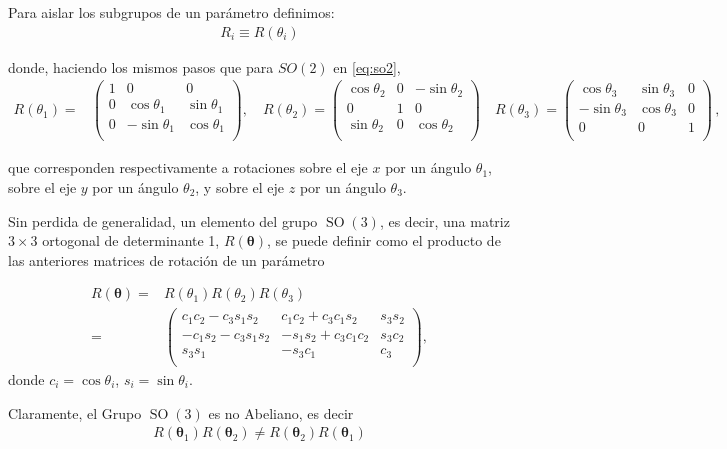 Para aislar los subgrupos de un parámetro definimos:
\begin{align}
  R_i\equiv R(\theta_i)
\end{align}
\begin{frame}
donde, haciendo los mismos pasos que para $SO(2)$ en \eqref{eq:so2},
\begin{align}
  \label{eq:lirot}
  R(\theta_1)=&
  \begin{pmatrix}
   1 &   0        &0\\
   0 &\cos\theta_1  & \sin\theta_1\\
   0 & -\sin\theta_1& \cos\theta_1\\
  \end{pmatrix},\quad R(\theta_2)=
  \begin{pmatrix}
     \cos\theta_2 &0& -\sin\theta_2\\
     0          &1& 0          \\
    \sin\theta_2  &0&  \cos\theta_2\\
  \end{pmatrix}\quad R(\theta_3)=
  \begin{pmatrix}
     \cos\theta_3 & \sin\theta_3&0\\
     -\sin\theta_3& \cos\theta_3&0\\
      0         &     0     &1\\
  \end{pmatrix}\,,
\end{align}
\end{frame}
que corresponden respectivamente a rotaciones sobre el eje $x$ por un ángulo $\theta_1$, sobre el eje $y$ por un ángulo $\theta_2$, y sobre el eje $z$ por un ángulo $\theta_3$.

Sin perdida de generalidad, un elemento del grupo $\operatorname{SO}(3)$, es decir, una matriz $3\times3$ ortogonal de determinante 1, $R(\boldsymbol{\theta})$, se puede definir como el producto de las anteriores matrices de rotación de un parámetro
\begin{frame}
\begin{align}
 R(\boldsymbol{\theta}) =&R(\theta_1)R(\theta_2)R(\theta_3) \nonumber\\
=&
  \begin{pmatrix}
    c_1 c_2-c_3 s_1 s_2    & c_1 c_2 + c_3 c_1 s_2  & s_3 s_2 \\
    -c_1 s_2 - c_3 s_1 s_2 & -s_1 s_2 + c_3 c_1 c_2 & s_3 c_2 \\
    s_3 s_1               & -s_3 c_1               & c_3\\
  \end{pmatrix},
\end{align}
donde $c_i=\cos \theta_i$,  $s_i=\sin \theta_i$.


Claramente, el Grupo $\operatorname{SO}(3)$ es no Abeliano, es decir
\begin{align*}
  R(\boldsymbol{\theta}_1)R(\boldsymbol{\theta}_2)\ne R(\boldsymbol{\theta}_2)R(\boldsymbol{\theta}_1)
\end{align*}
\end{frame}

